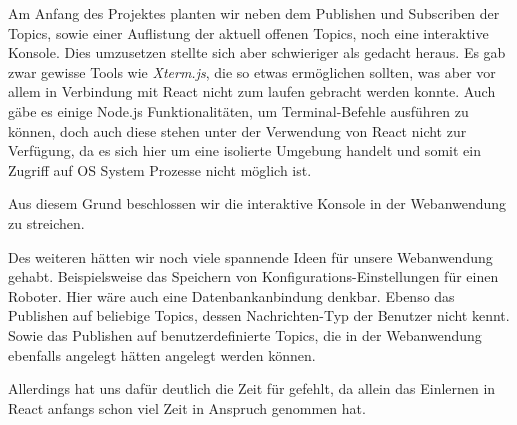 \begin{flushleft}
    Am Anfang des Projektes planten wir neben dem Publishen und Subscriben der Topics, sowie einer Auflistung der aktuell offenen Topics, noch eine interaktive Konsole.
    Dies umzusetzen stellte sich aber schwieriger als gedacht heraus. 
    Es gab zwar gewisse Tools wie \textit{Xterm.js}, die so etwas ermöglichen sollten, was aber vor allem in Verbindung mit React nicht zum laufen gebracht werden konnte.
    Auch gäbe es einige Node.js Funktionalitäten, um Terminal-Befehle ausführen zu können, doch auch diese stehen unter der Verwendung von React nicht zur Verfügung, da es sich hier um eine isolierte Umgebung handelt und somit ein Zugriff auf OS System Prozesse nicht möglich ist.

    Aus diesem Grund beschlossen wir die interaktive Konsole in der Webanwendung zu streichen.

    Des weiteren hätten wir noch viele spannende Ideen für unsere Webanwendung gehabt.
    Beispielsweise das Speichern von Konfigurations-Einstellungen für einen Roboter.
    Hier wäre auch eine Datenbankanbindung denkbar.
    Ebenso das Publishen auf beliebige Topics, dessen Nachrichten-Typ der Benutzer nicht kennt.
    Sowie das Publishen auf benutzerdefinierte Topics, die in der Webanwendung ebenfalls angelegt hätten angelegt werden können.
    
    Allerdings hat uns dafür deutlich die Zeit für gefehlt, da allein das Einlernen in React anfangs schon viel Zeit in Anspruch genommen hat.
\end{flushleft}